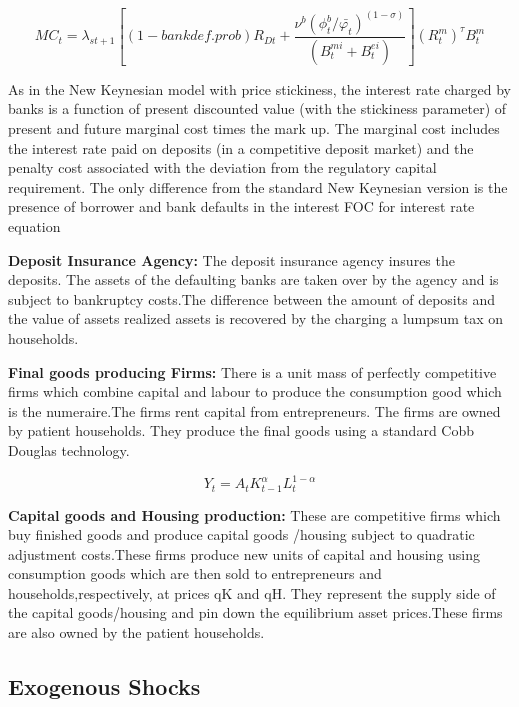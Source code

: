 \documentclass[12pt]{article}
\numberwithin{equation}{section}
\begin{document}
\begin{equation}
MC_t=\lambda_{st+1}[(1-bankdef.prob)R_{Dt}+\frac{\nu^b(\phi^b_t/{\bar{\varphi_t}})^{(1-\sigma)}}{(B^{mi}_t+B^{ei}_t)}](R^m_t)^\tau B^m_t
\end{equation}

As in the New Keynesian model with price stickiness, the interest rate charged by banks is a function of present discounted value (with the stickiness parameter) of present and future marginal cost times the mark up. The marginal cost includes the interest rate paid on deposits (in a competitive deposit market) and the penalty cost associated with the deviation from the regulatory capital requirement. The only difference from the standard New Keynesian version is the presence of borrower and bank defaults in the interest FOC for interest rate equation

\textbf{Deposit Insurance Agency:}
The deposit insurance agency insures the deposits. The assets of the defaulting banks are taken over by the agency and is subject to bankruptcy costs.The difference between the amount of deposits and the value of assets realized assets is recovered by the charging a lumpsum tax on households. 


\textbf{Final goods producing Firms:} 
There is a unit mass of perfectly competitive firms which combine capital and labour to produce the consumption good which is the numeraire.The firms rent capital from entrepreneurs. The firms are owned by patient households. They produce the final goods using a standard Cobb Douglas technology.

\begin{equation}
Y_{t}=A_{t} K^{\alpha}_{t-1}L^{1-\alpha}_{t}
\end{equation}

\textbf{Capital goods and Housing production:}
These are competitive firms which buy finished goods and produce capital goods /housing subject to quadratic adjustment costs.These firms produce new units of capital and housing using consumption goods which are then sold to entrepreneurs and households,respectively, at prices qK and qH. They represent the supply side of the capital goods/housing and pin down the equilibrium asset prices.These firms are also owned by the patient households.



\subsection*{Exogenous Shocks}
\end{document}
